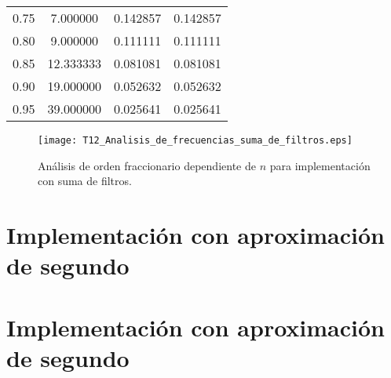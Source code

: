 \begin{table}[!hbp]
\begin{tabular}{cccc}
0.75 & 7.000000 & 0.142857 & 0.142857 \\ 
                                   
0.80 & 9.000000 & 0.111111 & 0.111111 \\ 
                                 
0.85 & 12.333333 & 0.081081 & 0.081081 \\
                                  
0.90 & 19.000000 & 0.052632 & 0.052632 \\
                                  
0.95 & 39.000000 & 0.025641 & 0.025641 \\
\hline                                              
\end{tabular}                                                                
\end{table} 

\begin{figure}[hbtp]
\caption{Análisis de orden fraccionario dependiente de $n$ para implementación con suma de filtros.} 
\label{fig:T12_Analisis_de_frecuencias_suma_de_filtros.eps}
\centering
\texttt{[image: T12\_Analisis\_de\_frecuencias\_suma\_de\_filtros.eps]}
\end{figure}
	
	\section{Implementación con aproximación de segundo}

	\section{Implementación con aproximación de segundo}
